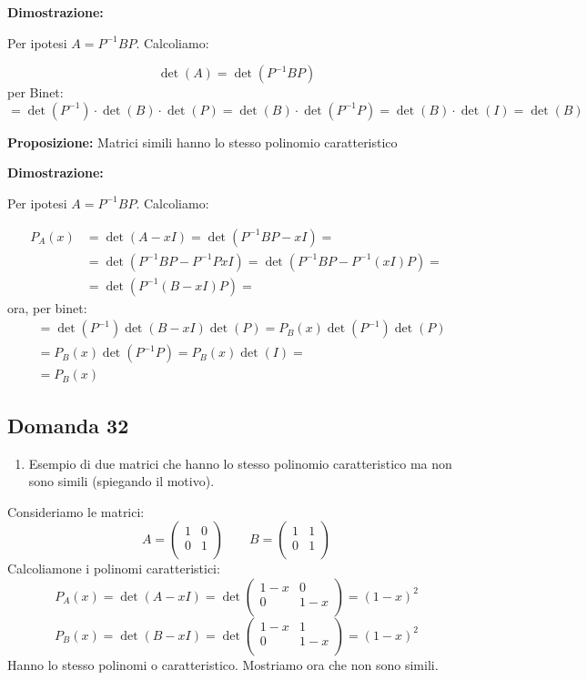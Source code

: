 \documentclass[
  a4paper,
]{article}
\providecommand{\tightlist}{%
  \setlength{\itemsep}{0pt}\setlength{\parskip}{0pt}}
\providecommand{\tightlist}{}
\begin{document}
\textbf{Dimostrazione:}

Per ipotesi \(A = P^{-1}BP\). Calcoliamo:

\[
\det(A) = \det(P^{-1}BP)
\] per Binet: \[
= \det(P^{-1})\cdot \det(B) \cdot \det(P) = \det(B) \cdot \det(P^{-1}P) = \det(B) \cdot \det(I) = \det(B)
\]

\bigskip

\textbf{Proposizione:} Matrici simili hanno lo stesso polinomio
caratteristico

\textbf{Dimostrazione:}

Per ipotesi \(A = P^{-1}BP\). Calcoliamo:

\[ 
\begin{aligned}
P_A(x) &=\det(A - xI) = \det(P^{-1}BP - xI) = \\
&=\det(P^{-1}BP - P^{-1}PxI) = \det(P^{-1}BP - P^{-1}(xI)P) = \\
&=\det(P^{-1}(B-xI)P) =
\end{aligned}
\] ora, per binet: \[
\begin{aligned}
&=\det(P^{-1})\det(B-xI) \det(P) = P_B(x)\det(P^{-1})\det(P)\\
&=P_B(x)\det(P^{-1}P) =P_B(x)\det(I) = \\
&=P_B(x)
\end{aligned}
\]

\hypertarget{domanda-32}{%
\subsection{Domanda 32}\label{domanda-32}}

\begin{observationbox}[Domanda]
\begin{enumerate}
\def\labelenumi{\arabic{enumi}.}
\setcounter{enumi}{31}
\tightlist
\item
  Esempio di due matrici che hanno lo stesso polinomio caratteristico ma
  non sono simili (spiegando il motivo).
\end{enumerate}
\end{observationbox}

Consideriamo le matrici: \[
A = 
\begin{pmatrix}
1 & 0 \\
0 & 1 \\
\end{pmatrix}  
\qquad
B = 
\begin{pmatrix}
1 & 1 \\
0 & 1 \\
\end{pmatrix}  
\] Calcoliamone i polinomi caratteristici: \[
P_A(x) = \det (A - xI) = \det
\begin{pmatrix}
1 -x & 0 \\
0 & 1 -x\\
\end{pmatrix}  
= (1-x)^2
\] \[
P_B(x) = \det (B - xI) = \det
\begin{pmatrix}
1 -x & 1 \\
0 & 1 -x\\
\end{pmatrix}  
= (1-x)^2
\] Hanno lo stesso polinomi o caratteristico. Mostriamo ora che non sono
simili.
\end{document}
